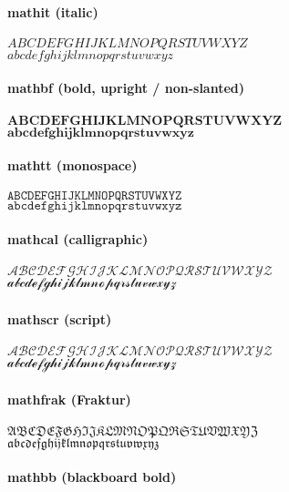 \documentclass[class=scrartcl,crop=false]{standalone}
\begin{document}
\paragraph{mathit (italic)}

$\mathit{ABCDEFGHIJKLMNOPQRSTUVWXYZ}$\\
$\mathit{abcdefghijklmnopqrstuvwxyz}$

\paragraph{mathbf (bold, upright / non-slanted)}

$\mathbf{ABCDEFGHIJKLMNOPQRSTUVWXYZ}$\\
$\mathbf{abcdefghijklmnopqrstuvwxyz}$

\paragraph{mathtt (monospace)}

$\mathtt{ABCDEFGHIJKLMNOPQRSTUVWXYZ}$\\
$\mathtt{abcdefghijklmnopqrstuvwxyz}$

\paragraph{mathcal (calligraphic)}

$\mathcal{ABCDEFGHIJKLMNOPQRSTUVWXYZ}$\\
$\mathcal{abcdefghijklmnopqrstuvwxyz}$

\paragraph{mathscr (script)}

$\mathscr{ABCDEFGHIJKLMNOPQRSTUVWXYZ}$\\
$\mathscr{abcdefghijklmnopqrstuvwxyz}$

\paragraph{mathfrak (Fraktur)}

$\mathfrak{ABCDEFGHIJKLMNOPQRSTUVWXYZ}$\\
$\mathfrak{abcdefghijklmnopqrstuvwxyz}$

\paragraph{mathbb (blackboard bold)}
\end{document}
